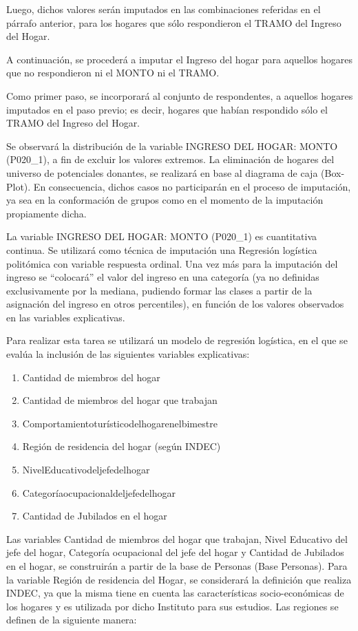\documentclass[
  openany]{book}
\begin{document}
Luego, dichos valores serán imputados en las combinaciones referidas en el párrafo anterior, para los hogares que sólo respondieron el TRAMO del Ingreso del Hogar.

A continuación, se procederá a imputar el Ingreso del hogar para aquellos hogares que no respondieron ni el MONTO ni el TRAMO.

Como primer paso, se incorporará al conjunto de respondentes, a aquellos hogares imputados en el paso previo; es decir, hogares que habían respondido sólo el TRAMO del Ingreso del Hogar.

Se observará la distribución de la variable INGRESO DEL HOGAR: MONTO (P020\_1), a fin de excluir los valores extremos. La eliminación de hogares del universo de potenciales donantes, se realizará en base al diagrama de caja (Box-Plot). En consecuencia, dichos casos no participarán en el proceso de imputación, ya sea en la conformación de grupos como en el momento de la imputación propiamente dicha.

La variable INGRESO DEL HOGAR: MONTO (P020\_1) es cuantitativa continua. Se utilizará como técnica de imputación una Regresión logística politómica con variable respuesta ordinal. Una vez más para la imputación del ingreso se ``colocará'' el valor del ingreso en una categoría (ya no definidas exclusivamente por la mediana, pudiendo formar las clases a partir de la asignación del ingreso en otros percentiles), en función de los valores observados en las variables explicativas.

Para realizar esta tarea se utilizará un modelo de regresión logística, en el que se evalúa la inclusión de las siguientes variables explicativas:

\begin{enumerate}
\def\labelenumi{\arabic{enumi}.}
\item
  Cantidad de miembros del hogar
\item
  Cantidad de miembros del hogar que trabajan
\item
  Comportamientoturísticodelhogarenelbimestre
\item
  Región de residencia del hogar (según INDEC)
\item
  NivelEducativodeljefedelhogar
\item
  Categoríaocupacionaldeljefedelhogar
\item
  Cantidad de Jubilados en el hogar
\end{enumerate}

Las variables Cantidad de miembros del hogar que trabajan, Nivel Educativo del jefe del hogar, Categoría ocupacional del jefe del hogar y Cantidad de Jubilados en el hogar, se construirán a partir de la base de Personas (Base Personas). Para la variable Región de residencia del Hogar, se considerará la definición que realiza INDEC, ya que la misma tiene en cuenta las características socio-económicas de los hogares y es utilizada por dicho Instituto para sus estudios. Las regiones se definen de la siguiente manera:
\end{document}

